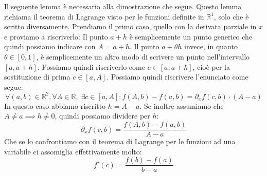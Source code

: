 Il seguente lemma è necessario alla dimostrazione che segue.
Questo lemma richiama il teorema di Lagrange visto per le funzioni definite in 
$\mathbb{R}^1$, solo che è scritto diversamente. Prendiamo il primo caso, 
quello con la derivata parziale in $x$ e proviamo a riscriverlo: Il punto 
$a + h$ è semplicemente un punto generico che quindi possiamo indicare con 
$A = a + h$. Il punto $a + \theta h$ invece, in quanto $\theta \in [0, 1]$, è 
semplicemente un altro modo di scrivere un punto nell'intervallo $[a, a + h]$. 
Possiamo quindi riscriverlo come $c \in [a, a+h]$, cioè per la sostituzione di 
prima $c \in [a, A]$. Possiamo quindi riscrivere l'enunciato come segue:
\begin{equation*}
	\forall (a, b) \in \mathbb{R}^2, \forall A \in \mathbb{R}, \; \exists c 
	\in [a, A] : f(A, b) - f(a, b) = \partial_x f(c, b) \cdot (A - a)
\end{equation*}
In questo caso abbiamo riscritto $h = A - a$. Se inoltre assumiamo che $A \neq 
a \implies h \neq 0 $, quindi possiamo dividere per $h$:
\begin{equation*}
	\partial_x f(c, b) = \dfrac{f(A, b) - f(a, b)}{A - a}
\end{equation*}
Che se lo confrontiamo con il teorema di Lagrange per le funzioni ad una 
variabile ci assomiglia effettivamente molto:
\begin{equation*}
	f'(c) = \dfrac{f(b) - f(a)}{b - a}
\end{equation*}

